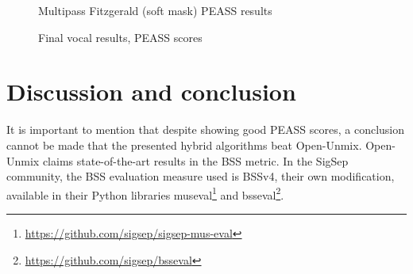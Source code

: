 \documentclass[letter,12pt]{article}
\begin{document}
\begin{figure}[ht]
	\centering
	\caption{Multipass Fitzgerald (soft mask) PEASS results}
	\label{fig:vocalround1soft}
	\vspace{1em}
	\caption{Final vocal results, PEASS scores}
	\label{fig:finalvocal}
\end{figure}

\vfill
\clearpage %

\section{Discussion and conclusion}

It is important to mention that despite showing good PEASS scores, a conclusion cannot be made that the presented hybrid algorithms beat Open-Unmix. Open-Unmix claims state-of-the-art results \cite{umxsota} in the BSS metric. In the SigSep community, the BSS evaluation measure used is BSSv4, their own modification, available in their Python libraries museval\footnote{\url{https://github.com/sigsep/sigsep-mus-eval}} and bsseval\footnote{\url{https://github.com/sigsep/bsseval}}.
\end{document}
